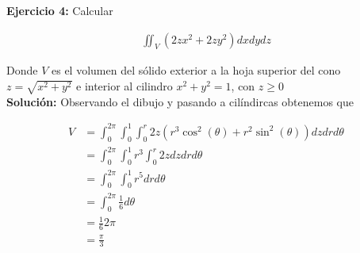 \documentclass[a4paper]{article}
\begin{document}
\newpage

\textbf{Ejercicio 4:} Calcular

\begin{align*}
    \iint_V (2zx^2+2zy^2)dxdydz
\end{align*}

Donde $V$ es el volumen del sólido exterior a la hoja superior del cono $z=\sqrt{x^2+y^2}$ e interior al cilindro $x^2+y^2=1$, con $z \geq 0$ \\

\textbf{Solución: } Observando el dibujo y pasando a cilíndircas obtenemos que

\begin{align*}
    V &= \int_0^{2\pi}\int_0^1\int_0^{r} 2z(r^3\cos^2(\theta)+r^2\sin^2(\theta))dzdrd\theta \\
    &= \int_0^{2\pi}\int_0^1 r^3 \int_0^{r} 2zdzdrd\theta \\
    &= \int_0^{2\pi}\int_0^1 r^5drd\theta \\
    &= \int_0^{2\pi} \frac{1}{6}d\theta \\
    &= \frac{1}{6}2\pi \\
    &= \frac{\pi}{3}
\end{align*}
\end{document}
